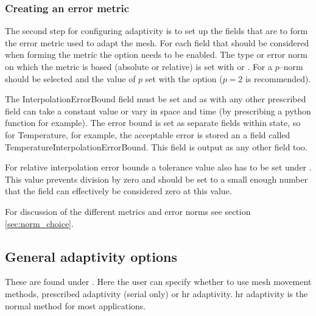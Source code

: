 \subsubsection{Creating an error metric}
\label{sec:configuring_fluidity_error_metric}

The second step for configuring adaptivity is to set up the fields that are to form the error metric used
to adapt the mesh. For each field that should be considered when forming the metric the option
 needs to be enabled. The type or error norm on which the metric is based (absolute or relative) is set with  or . For a $p$--norm  should be selected and the value of $p$ set with the option  ($p=2$ is recommended).

The InterpolationErrorBound field must be set and as with any other prescribed field can take a constant value or vary in space and time (by prescribing a python function for example). The error bound is set as separate fields within 
state, so for Temperature, for example, the acceptable error is stored an a field called 
TemperatureInterpolationErrorBound. This field is output as any other field too.

For relative interpolation error bounds a tolerance value also has to be set under \newline
{}. This value prevents division by zero
and should be set to a small enough number that the field can effectively be considered zero at this value.

For discussion of the different metrics and error norms see section \ref{sec:norm_choice}.

\subsection{General adaptivity options}
\label{sec:configuring_fluidity_adaptivity_options}

These are found under . Here the user can specify whether to use mesh movement methods, 
prescribed adaptivity (serial only) or hr adaptivity. hr adaptivity is the normal method for most applications.

